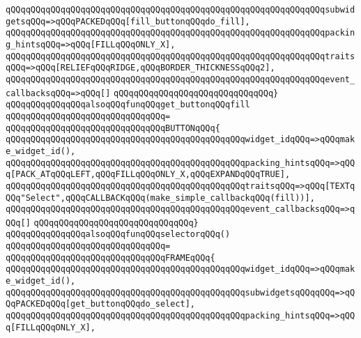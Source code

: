 \verb|qQQqqQQqqQQqqQQqqQQqqQQqqQQqqQQqqQQqqQQqqQQqqQQqqQQqqQQqqQQqqQQqsubwidgetsqQQq=>qQQqPACKEDqQQq[fill_buttonqQQqdo_fill],|\newline
\verb|qQQqqQQqqQQqqQQqqQQqqQQqqQQqqQQqqQQqqQQqqQQqqQQqqQQqqQQqqQQqqQQqpacking_hintsqQQq=>qQQq[FILLqQQqONLY_X],|\newline
\verb|qQQqqQQqqQQqqQQqqQQqqQQqqQQqqQQqqQQqqQQqqQQqqQQqqQQqqQQqqQQqqQQqtraitsqQQq=>qQQq[RELIEFqQQqRIDGE,qQQqBORDER_THICKNESSqQQq2],|\newline
\verb|qQQqqQQqqQQqqQQqqQQqqQQqqQQqqQQqqQQqqQQqqQQqqQQqqQQqqQQqqQQqqQQqevent_callbacksqQQq=>qQQq[]|\newline
\verb|qQQqqQQqqQQqqQQqqQQqqQQqqQQqqQQq}|\newline
\newline
\verb|qQQqqQQqqQQqqQQqalsoqQQqfunqQQqget_buttonqQQqfill|\newline
\verb|qQQqqQQqqQQqqQQqqQQqqQQqqQQqqQQq=|\newline
\verb|qQQqqQQqqQQqqQQqqQQqqQQqqQQqqQQqBUTTONqQQq{|\newline
\verb|qQQqqQQqqQQqqQQqqQQqqQQqqQQqqQQqqQQqqQQqqQQqqQQqwidget_idqQQq=>qQQqmake_widget_id(),|\newline
\verb|qQQqqQQqqQQqqQQqqQQqqQQqqQQqqQQqqQQqqQQqqQQqqQQqpacking_hintsqQQq=>qQQq[PACK_ATqQQqLEFT,qQQqFILLqQQqONLY_X,qQQqEXPANDqQQqTRUE],|\newline
\verb|qQQqqQQqqQQqqQQqqQQqqQQqqQQqqQQqqQQqqQQqqQQqqQQqtraitsqQQq=>qQQq[TEXTqQQq"Select",qQQqCALLBACKqQQq(make_simple_callbackqQQq(fill))],|\newline
\verb|qQQqqQQqqQQqqQQqqQQqqQQqqQQqqQQqqQQqqQQqqQQqqQQqevent_callbacksqQQq=>qQQq[]|\newline
\verb|qQQqqQQqqQQqqQQqqQQqqQQqqQQqqQQq}|\newline
\newline
\verb|qQQqqQQqqQQqqQQqalsoqQQqfunqQQqselectorqQQq()|\newline
\verb|qQQqqQQqqQQqqQQqqQQqqQQqqQQqqQQq=|\newline
\verb|qQQqqQQqqQQqqQQqqQQqqQQqqQQqqQQqFRAMEqQQq{|\newline
\verb|qQQqqQQqqQQqqQQqqQQqqQQqqQQqqQQqqQQqqQQqqQQqqQQqwidget_idqQQq=>qQQqmake_widget_id(),|\newline
\verb|qQQqqQQqqQQqqQQqqQQqqQQqqQQqqQQqqQQqqQQqqQQqqQQqsubwidgetsqQQqqQQq=>qQQqPACKEDqQQq[get_buttonqQQqdo_select],|\newline
\verb|qQQqqQQqqQQqqQQqqQQqqQQqqQQqqQQqqQQqqQQqqQQqqQQqpacking_hintsqQQq=>qQQq[FILLqQQqONLY_X],|\newline
